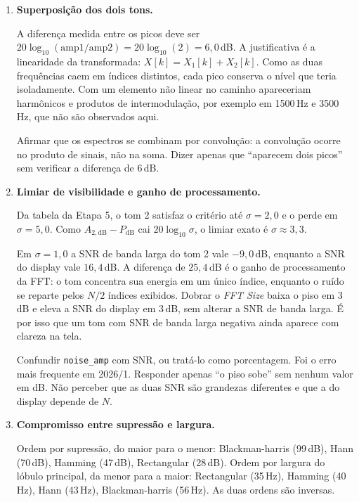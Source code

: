 \documentclass[11pt,a4paper]{article}
\begin{document}
\begin{enumerate}[label=\textbf{Q\arabic*.}, leftmargin=*, itemsep=1em]
  \item \textbf{Superposição dos dois tons.}

    A diferença medida entre os picos deve ser
    $20\log_{10}(\mathrm{amp1}/\mathrm{amp2}) = 20\log_{10}(2) = 6{,}0$\,dB.
    A justificativa é a linearidade da transformada: $X[k] = X_1[k] + X_2[k]$.
    Como as duas frequências caem em índices distintos, cada pico conserva o
    nível que teria isoladamente. Com um elemento não linear no caminho
    apareceriam harmônicos e produtos de intermodulação, por exemplo em
    1500\,Hz e 3500\,Hz, que não são observados aqui.

    \begin{nota}
      Afirmar que os espectros se combinam por convolução: a convolução ocorre
      no produto de sinais, não na soma. Dizer apenas que ``aparecem dois
      picos'' sem verificar a diferença de 6\,dB.
    \end{nota}

  \item \textbf{Limiar de visibilidade e ganho de processamento.}

    Da tabela da Etapa 5, o tom 2 satisfaz o critério até $\sigma = 2{,}0$ e o
    perde em $\sigma = 5{,}0$. Como $A_{2,\mathrm{dB}} - P_{\mathrm{dB}}$ cai
    $20\log_{10}\sigma$, o limiar exato é $\sigma \approx 3{,}3$.

    Em $\sigma = 1{,}0$ a SNR de banda larga do tom 2 vale $-9{,}0$\,dB,
    enquanto a SNR do display vale $16{,}4$\,dB. A diferença de $25{,}4$\,dB é o
    ganho de processamento da FFT: o tom concentra sua energia em um único
    índice, enquanto o ruído se reparte pelos $N/2$ índices exibidos. Dobrar o
    \textit{FFT Size} baixa o piso em 3\,dB e eleva a SNR do display em 3\,dB,
    sem alterar a SNR de banda larga. É por isso que um tom com SNR de banda
    larga negativa ainda aparece com clareza na tela.

    \begin{nota}
      Confundir \texttt{noise\_amp} com SNR, ou tratá-lo como porcentagem. Foi
      o erro mais frequente em 2026/1. Responder apenas ``o piso sobe'' sem
      nenhum valor em dB. Não perceber que as duas SNR são grandezas
      diferentes e que a do display depende de $N$.
    \end{nota}

  \item \textbf{Compromisso entre supressão e largura.}

    Ordem por supressão, do maior para o menor:
    Blackman-harris (99\,dB), Hann (70\,dB), Hamming (47\,dB),
    Rectangular (28\,dB). Ordem por largura do lóbulo principal, da menor para
    a maior: Rectangular (35\,Hz), Hamming (40\,Hz), Hann (43\,Hz),
    Blackman-harris (56\,Hz). As duas ordens são inversas.


\end{enumerate}
\end{document}
